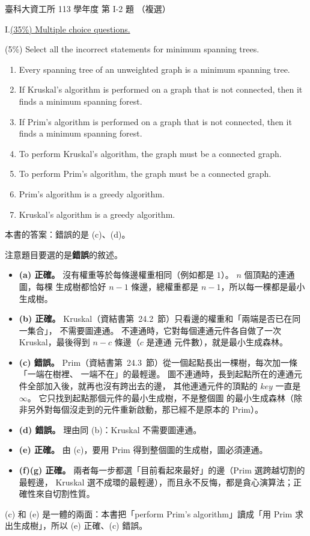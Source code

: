 \begin{pastexam}[label={px:ntust-113-ice-02}]{臺科大資工所 113 學年度 第 I-2 題}
（複選）

I.\quad \underline{(35\%) Multiple choice questions.}

(5\%) Select all the incorrect statements for minimum spanning trees.
\begin{enumerate}[label=(\alph*)]
\item Every spanning tree of an unweighted graph is a minimum spanning tree.
\item If Kruskal's algorithm is performed on a graph that is not connected, then it finds a minimum
spanning forest.
\item If Prim's algorithm is performed on a graph that is not connected, then it finds a minimum
spanning forest.
\item To perform Kruskal's algorithm, the graph must be a connected graph.
\item To perform Prim's algorithm, the graph must be a connected graph.
\item Prim's algorithm is a greedy algorithm.
\item Kruskal's algorithm is a greedy algorithm.
\end{enumerate}
\end{pastexam}

\begin{pastsoln}
本書的答案：錯誤的是 (c)、(d)。

注意題目要選的是\textbf{錯誤}的敘述。
\begin{itemize}
\item \textbf{(a) 正確。} 沒有權重等於每條邊權重相同（例如都是 $1$）。 $n$ 個頂點的連通圖，每棵
生成樹都恰好 $n - 1$ 條邊，總權重都是 $n - 1$，所以每一棵都是最小生成樹。
\item \textbf{(b) 正確。} Kruskal（資結書第~24.2~節）只看邊的權重和「兩端是否已在同一集合」，
不需要圖連通。 不連通時，它對每個連通元件各自做了一次 Kruskal，最後得到 $n - c$ 條邊（$c$ 是連通
元件數），就是最小生成森林。
\item \textbf{(c) 錯誤。} Prim（資結書第~24.3~節）從一個起點長出一棵樹，每次加一條「一端在樹裡、
一端不在」的最輕邊。 圖不連通時，長到起點所在的連通元件全部加入後，就再也沒有跨出去的邊，
其他連通元件的頂點的 $\mathit{key}$ 一直是 $\infty$。 它只找到起點那個元件的最小生成樹，不是整個圖
的最小生成森林（除非另外對每個沒走到的元件重新啟動，那已經不是原本的 Prim）。
\item \textbf{(d) 錯誤。} 理由同 (b)：Kruskal 不需要圖連通。
\item \textbf{(e) 正確。} 由 (c)，要用 Prim 得到整個圖的生成樹，圖必須連通。
\item \textbf{(f)(g) 正確。} 兩者每一步都選「目前看起來最好」的邊（Prim 選跨越切割的最輕邊，
Kruskal 選不成環的最輕邊），而且永不反悔，都是貪心演算法；正確性來自切割性質。
\end{itemize}
(c) 和 (e) 是一體的兩面：本書把「perform Prim's algorithm」讀成「用 Prim 求出生成樹」，所以 (e)
正確、(c) 錯誤。
\end{pastsoln}
